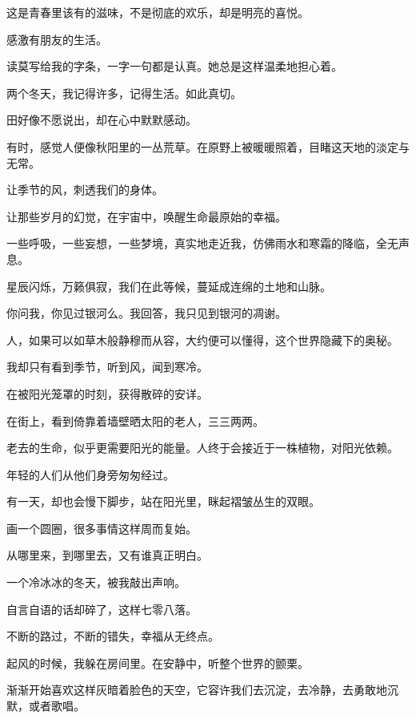 \documentclass[12pt,a4paper]{article}
\begin{document}
		这是青春里该有的滋味，不是彻底的欢乐，却是明亮的喜悦。\par
		感激有朋友的生活。\par
		读莫写给我的字条，一字一句都是认真。她总是这样温柔地担心着。\par
		两个冬天，我记得许多，记得生活。如此真切。\par
		田好像不愿说出，却在心中默默感动。\par
		有时，感觉人便像秋阳里的一丛荒草。在原野上被暖暖照着，目睹这天地的淡定与无常。\par
		让季节的风，刺透我们的身体。\par
		让那些岁月的幻觉，在宇宙中，唤醒生命最原始的幸福。\par
		一些呼吸，一些妄想，一些梦境，真实地走近我，仿佛雨水和寒霜的降临，全无声息。\par
		星辰闪烁，万籁俱寂，我们在此等候，蔓延成连绵的土地和山脉。\par
		你问我，你见过银河么。我回答，我只见到银河的凋谢。\par
		人，如果可以如草木般静穆而从容，大约便可以懂得，这个世界隐藏下的奥秘。\par
		我却只有看到季节，听到风，闻到寒冷。\par
		在被阳光笼罩的时刻，获得散碎的安详。\par
		在街上，看到倚靠着墙壁晒太阳的老人，三三两两。\par
		老去的生命，似乎更需要阳光的能量。人终于会接近于一株植物，对阳光依赖。\par
		年轻的人们从他们身旁匆匆经过。\par
		有一天，却也会慢下脚步，站在阳光里，眯起褶皱丛生的双眼。\par
		画一个圆圈，很多事情这样周而复始。\par
		从哪里来，到哪里去，又有谁真正明白。\par
		一个冷冰冰的冬天，被我敲出声响。\par
		自言自语的话却碎了，这样七零八落。

	\endwriting



		不断的路过，不断的错失，幸福从无终点。

		起风的时候，我躲在房间里。在安静中，听整个世界的颤栗。\par
		渐渐开始喜欢这样灰暗着脸色的天空，它容许我们去沉淀，去冷静，去勇敢地沉默，或者歌唱。
\end{document}
